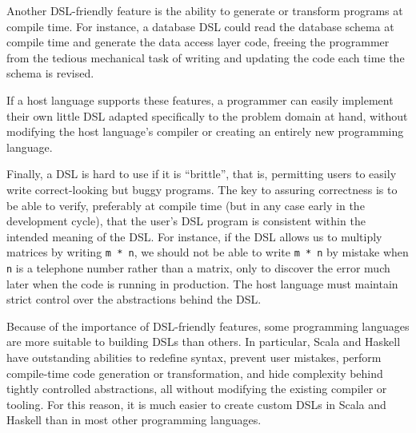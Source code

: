 Another DSL-friendly feature is the ability to generate or transform
programs at compile time. For instance, a database DSL could read
the database schema at compile time and generate the data access layer
code, freeing the programmer from the tedious mechanical task of writing
and updating the code each time the schema is revised. 

If a host language supports these features, a programmer can easily
implement their own little DSL adapted specifically to the problem
domain at hand, without modifying the host language\textsf{'}s compiler or
creating an entirely new programming language.

Finally, a DSL is hard to use if it is \textsf{``}brittle\textsf{''}, \textemdash{}
that is, permitting users to easily write correct-looking but buggy
programs. The key to assuring correctness is to be able to verify,
preferably at compile time (but in any case early in the development
cycle), that the user\textsf{'}s DSL program is consistent within the intended
meaning of the DSL. For instance, if the DSL allows us to multiply
matrices by writing \lstinline!m * n!, we should not be able to write
\lstinline!m * n! by mistake when \lstinline!n! is a telephone number
rather than a matrix, only to discover the error much later when the
code is running in production. The host language must maintain strict
control over the abstractions behind the DSL.

Because of the importance of DSL-friendly features, some programming
languages are more suitable to building DSLs than others. In particular,
Scala and Haskell have outstanding abilities to redefine syntax, prevent
user mistakes, perform compile-time code generation or transformation,
and hide complexity behind tightly controlled abstractions, \textemdash{}
all without modifying the existing compiler or tooling. For this reason,
it is much easier to create custom DSLs in Scala and Haskell than
in most other programming languages. 


